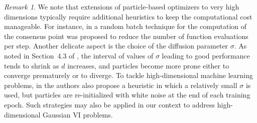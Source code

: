\documentclass{article}
\theoremstyle{plain}
\theoremstyle{definition}
\theoremstyle{remark}
\newtheorem{remark}[theorem]{Remark}
\begin{document}
\begin{remark}
We note that extensions of particle-based optimizers to very high dimensions typically require additional heuristics to keep the computational cost manageable. 
For instance, in \cite{carrillo2021consensus} a random batch technique for the computation of the consensus point was proposed to reduce the number of function evaluations per step. 
Another delicate aspect is the choice of the diffusion parameter $\sigma$. 
As noted in Section~4.3 of \cite{borghi2023constrained}, the interval of values of $\sigma$ leading to good performance tends to shrink as $d$ increases, and particles become more prone either to converge prematurely or to diverge. 
To tackle high-dimensional machine learning problems, in \cite{carrillo2021consensus} the authors also propose a heuristic in which a relatively small $\sigma$ is used, but particles are re-initialized with white noise at the end of each training epoch. 
Such strategies may also be applied in our context to address high-dimensional Gaussian VI problems.
\end{remark}
\end{document}
